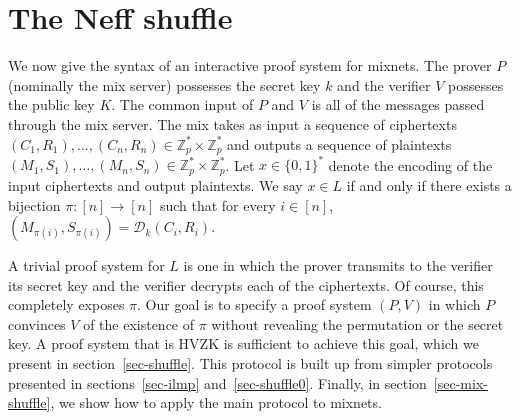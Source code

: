 \documentclass[letter]{article}
\newcommand{\Zmodp}{\mathbb{Z}_p}
\newcommand{\bits}{\{0,1\}}
\newcommand*\by{\times}
\newcommand{\pk}{K}
\newcommand{\sk}{k}
\newcommand{\varm}{M}
\newcommand{\varc}{C}
\newcommand{\varr}{R}
\newcommand{\dec}{\mathcal{D}}
\begin{document}
\section{The Neff shuffle} \label{section:neff-shuffle}

We now give the syntax of an interactive proof system for mixnets. The prover
$P$ (nominally the mix server) possesses the secret key $\sk$ and the verifier
$V$ possesses the public key $\pk$. The common input of $P$ and $V$ is all of
the messages passed through the mix server. The mix takes as input a sequence of
ciphertexts $(\varc_1, \varr_1), \ldots, (\varc_n, \varr_n) \in \Zmodp^* \by
\Zmodp^*$ and outputs a sequence of plaintexts $(\varm_{1}, S_1), \ldots,
(\varm_{n}, S_n) \in
\Zmodp^* \by \Zmodp^*$. Let $x \in \bits^*$ denote the encoding of the input ciphertexts and
output plaintexts. We say $x \in L$ if and only if there exists a bijection $\pi
: [n] \rightarrow [n] $ such that for every $i \in [n]$,
$(\varm_{\pi(i)}, S_{\pi(i)}) = \dec_k(\varc_{i}, \varr_{i})$.

A trivial proof system for $L$ is one in which the prover transmits to the
verifier its secret key and the verifier decrypts each of the ciphertexts. Of
course, this completely exposes $\pi$. Our goal is to specify a proof system
$(P, V)$ in which $P$ convinces $V$ of the existence of $\pi$ without revealing
the permutation or the secret key. A proof system that is HVZK is sufficient to
achieve this goal, which we present in section~\ref{sec-shuffle}. This protocol
is built up from simpler protocols presented in sections~\ref{sec-ilmp}
and~\ref{sec-shuffle0}. Finally, in section~\ref{sec-mix-shuffle}, we show how
to apply the main protocol to mixnets.
\end{document}
